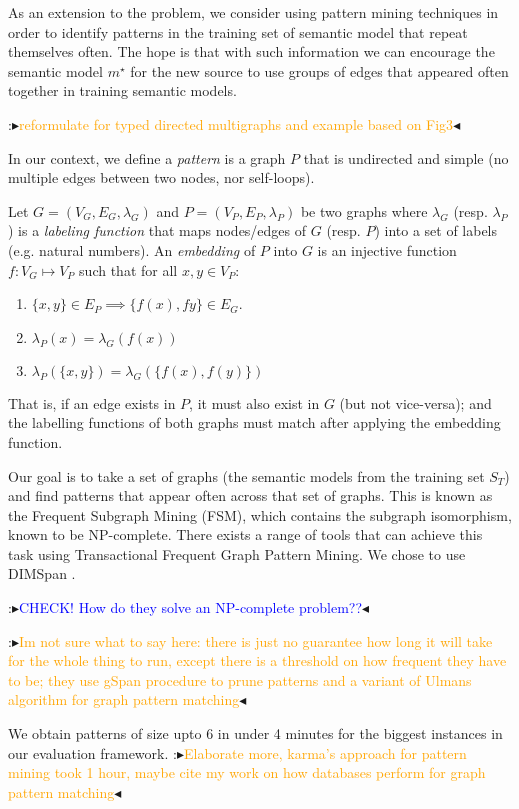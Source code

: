 \documentclass[letterpaper]{article} %
\newcommand{\authornote}[3]{
  {\fbox{\sc 
  #1}:$\blacktriangleright$\textcolor{#2}{\small{#3}}$\blacktriangleleft$}%
}
\newcommand{\ddg}[1]{\authornote{DDG}{blue}{#1}}
\newcommand{\npr}[1]{\authornote{NPR}{orange}{#1}}
\begin{document}
As an extension to the problem, we consider using pattern mining techniques in order to identify patterns in the training set of semantic model that repeat themselves often. 
The hope is that with such information we can encourage the semantic model $m^\star$ for the new source to use groups of edges that                                       appeared often together in training semantic models.

\npr{reformulate for typed directed multigraphs and example based on Fig3}
In our context, we define a \emph{pattern} is a graph $P$ that is undirected 
and simple (no multiple edges between two nodes, nor self-loops).

Let $G = (V_G,E_G,\lambda_G)$ and $P = (V_P,E_P, \lambda_P)$ be two graphs 
where $\lambda_G$ (resp. $\lambda_P$) is a \emph{labeling function} that maps 
nodes/edges of $G$ (resp. $P$) into a set of labels (e.g. natural numbers).
An \emph{embedding} of $P$ into $G$ is an injective function $f : V_G \mapsto 
V_P$ such that for all $x,y \in V_P$:
\begin{enumerate}
	\item $\{x,y\} \in E_P \implies \{f(x),f{y}\} \in E_G$.
	\item $\lambda_P(x) = \lambda_G(f(x))$
	\item $\lambda_P(\{x,y\}) = \lambda_G(\{f(x),f(y)\})$
\end{enumerate} 
That is, if an edge exists in $P$, it must also exist in $G$ (but not 
vice-versa); and the labelling functions of both graphs must match after 
applying the embedding function.

Our goal is to take a set of graphs (the semantic models from the training set 
$S_T$) and find patterns that appear often across that set of graphs. This is 
known as the Frequent Subgraph Mining (FSM), which contains the subgraph 
isomorphism, known to be NP-complete. 
There exists a range of tools that can achieve this task using Transactional 
Frequent Graph Pattern Mining\cite{petermann2017dimspan,yan2002gspan}. 
We chose to use DIMSpan \cite{petermann2017dimspan}. 
\ddg{CHECK! How do they solve an NP-complete problem??}
\npr{Im not sure what to say here: there is just no guarantee how long it will take for the whole thing to run, except there is a threshold on how frequent they have to be; they use gSpan procedure to prune patterns and a variant of Ulmans algorithm for graph pattern matching}
 
We obtain patterns of size upto 6 in under 4 minutes for the biggest instances in our evaluation framework. \npr{Elaborate more, karma's approach for pattern mining took 1 hour, maybe cite my work on how databases perform for graph pattern matching}
\end{document}
